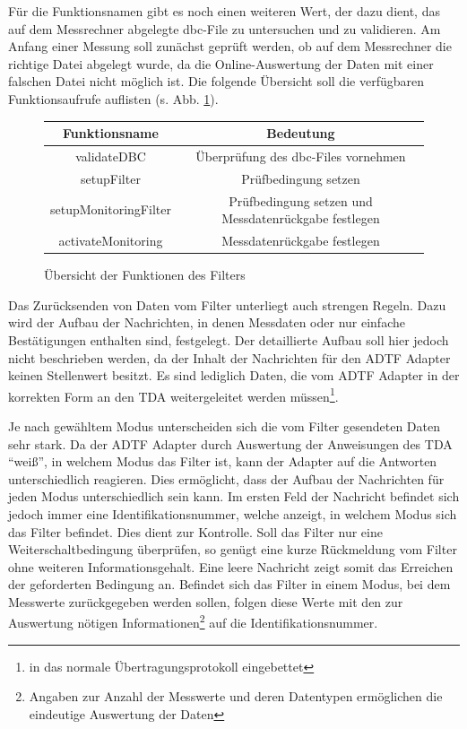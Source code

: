 \documentclass[12pt,a4paper]{report}
\begin{document}
Für die Funktionsnamen gibt es noch einen weiteren Wert, der dazu dient, das auf dem Messrechner abgelegte dbc-File zu untersuchen und zu validieren. Am Anfang einer Messung soll zunächst geprüft werden, ob auf dem Messrechner die richtige Datei abgelegt wurde, da die Online-Auswertung der Daten mit einer falschen Datei nicht möglich ist. Die folgende Übersicht soll die verfügbaren Funktionsaufrufe auflisten (s. Abb. \ref{tab:Uebersicht der Funktionen des Filters}).
\begin{figure}[H]
\begin{center}
\begin{tabular}{|c|c|}
\hline
Funktionsname & Bedeutung \\
\hline\hline
validateDBC & Überprüfung des dbc-Files vornehmen\\
setupFilter & Prüfbedingung setzen\\
setupMonitoringFilter & Prüfbedingung setzen und Messdatenrückgabe festlegen\\
activateMonitoring & Messdatenrückgabe festlegen\\
\hline
\end{tabular}
\caption{Übersicht der Funktionen des Filters }\label{tab:Uebersicht der Funktionen des Filters}
\end{center}
\end{figure}
\noindent Das Zurücksenden von Daten vom Filter unterliegt auch strengen Regeln. Dazu wird der Aufbau der Nachrichten, in denen Messdaten oder nur einfache Bestätigungen enthalten sind, festgelegt. Der detaillierte Aufbau soll hier jedoch nicht beschrieben werden, da der Inhalt der Nachrichten für den ADTF Adapter keinen Stellenwert besitzt. Es sind lediglich Daten, die vom ADTF Adapter in der korrekten Form an den TDA weitergeleitet werden müssen\footnote{in das normale Übertragungsprotokoll eingebettet}.

Je nach gewähltem Modus unterscheiden sich die vom Filter gesendeten Daten sehr stark. Da der ADTF Adapter durch Auswertung der Anweisungen des TDA "`wei\ss "', in welchem Modus das Filter ist, kann der Adapter auf die Antworten unterschiedlich reagieren. Dies ermöglicht, dass der Aufbau der Nachrichten für jeden Modus unterschiedlich sein kann. Im ersten Feld der Nachricht befindet sich jedoch immer eine Identifikationsnummer, welche anzeigt, in welchem Modus sich das Filter befindet. Dies dient zur Kontrolle. Soll das Filter nur eine Weiterschaltbedingung überprüfen, so genügt eine kurze Rückmeldung vom Filter ohne weiteren Informationsgehalt. Eine leere Nachricht zeigt somit das Erreichen der geforderten Bedingung an. Befindet sich das Filter in einem Modus, bei dem Messwerte zurückgegeben werden sollen, folgen diese Werte mit den zur Auswertung nötigen Informationen\footnote{Angaben zur Anzahl der Messwerte und deren Datentypen ermöglichen die eindeutige Auswertung der Daten} auf die Identifikationsnummer. 
\end{document}
